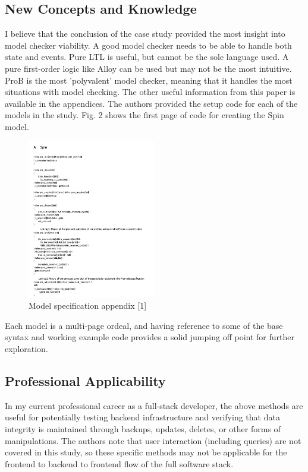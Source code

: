 \documentclass[conference]{IEEEtran}
\begin{document}
\subsection{New Concepts and Knowledge}
I believe that the conclusion of the case study provided the most insight into model checker viability. A good model checker needs to be able to handle both state and events. Pure LTL is useful, but cannot be the sole language used. A pure first-order logic like Alloy can be used but may not be the most intuitive. ProB is the most 'polyvalent' model checker, meaning that it handles the most situations with model checking. The other useful information from this paper is available in the appendices. The authors provided the setup code for each of the models in the study. Fig. 2 shows the first page of code for creating the Spin model.

\begin{figure}[htbp]
\centerline{\includegraphics[width=0.5\textwidth]{./images/spin_appendix.png}}
\caption{Model specification appendix [1]}
\label{fig}
\end{figure}

Each model is a multi-page ordeal, and having reference to some of the base syntax and working example code provides a solid jumping off point for further exploration.

\subsection{Professional Applicability}
In my current professional career as a full-stack developer, the above methods are useful for potentially testing backend infrastructure and verifying that data integrity is maintained through backups, updates, deletes, or other forms of manipulations. The authors note that user interaction (including queries) are not covered in this study, so these specific methods may not be applicable for the frontend to backend to frontend flow of the full software stack.
\end{document}
